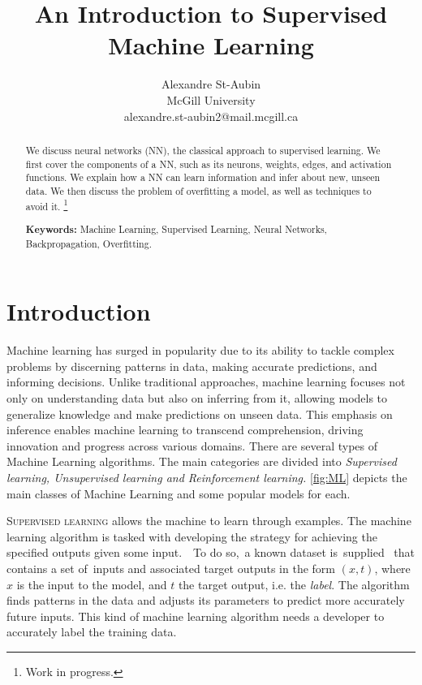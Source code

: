 \documentclass{article}
\title{An Introduction to Supervised Machine Learning}
\author{
  Alexandre St-Aubin \\
  \hspace{0.5mm} McGill University \\
  \hspace{0.5mm} alexandre.st-aubin2@mail.mcgill.ca\\
  }
\begin{document}
 
\maketitle

\begin{abstract} 

\noindent
  We discuss neural networks (NN), the classical approach to supervised learning. We first cover the components of a NN, such as its neurons, weights, edges, and activation functions. We explain how a NN can learn information and infer about new, unseen data. We then discuss the problem of overfitting a model, as well as techniques to avoid it.
  \footnote{Work in progress.}

\vspace{5mm}


\textbf{Keywords:} Machine Learning, Supervised Learning, Neural Networks, Backpropagation, Overfitting.


\textbf{}

\end{abstract} 


\vfill

\clearpage

\newpage

\tableofcontents

\newpage

\section{Introduction}
Machine learning has surged in popularity due to its ability to tackle complex problems by discerning patterns in data, making accurate predictions, and informing decisions. Unlike traditional approaches, machine learning focuses not only on understanding data but also on inferring from it, allowing models to generalize knowledge and make predictions on unseen data. This emphasis on inference enables machine learning to transcend comprehension, driving innovation and progress across various domains. There are several types of Machine Learning algorithms. The main categories are divided into \textit{Supervised learning, Unsupervised learning and Reinforcement learning.} \autoref{fig:ML} depicts the main classes of Machine Learning and some popular models for each. 

\vspace{4mm}
  \noindent \textsc{Supervised learning} allows the machine to learn through examples. The machine learning algorithm is tasked with developing the strategy for achieving the specified outputs given some input.  To do so, a known dataset is supplied  that contains a set of inputs and associated target outputs in the form $(x, t)$, where $x$ is the input to the model, and $t$ the target output, i.e. the \textit{label}. The algorithm finds patterns in the data and adjusts its parameters to predict more accurately future inputs. This kind of machine learning algorithm needs a developer to accurately label the training data. 
\end{document}
